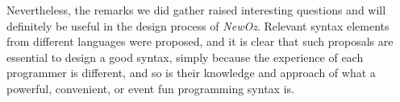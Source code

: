 Nevertheless, the remarks we did gather raised interesting questions and will definitely be useful in the design process of \textit{NewOz}.
Relevant syntax elements from different languages were proposed, and it is clear that such proposals are essential to design a good syntax, simply because the experience of each programmer is different, and so is their knowledge and approach of what a powerful, convenient, or event fun programming syntax is.
